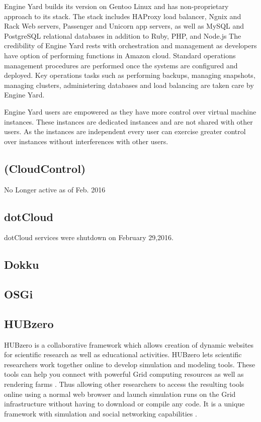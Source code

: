     Engine Yard builds its version on Gentoo Linux and has
    non-proprietary approach to its stack. The stack includes HAProxy
    load balancer, Ngnix and Rack Web servers, Passenger and Unicorn
    app servers, as well as MySQL and PostgreSQL relational databases
    in addition to Ruby, PHP, and Node.js The credibility of Engine
    Yard rests with orchestration and management as developers have
    option of performing functions in Amazon cloud. Standard
    operations management procedures are performed once the systems
    are configured and deployed. Key operations tasks such as
    performing backups, managing snapshots, managing clusters,
    administering databases and load balancing are taken care by
    Engine Yard.
    
    Engine Yard users are empowered as they have more control over
    virtual machine instances. These instances are dedicated instances
    and are not shared with other users. As the instances are
    independent every user can exercise greater control over instances
    without interferences with other users.

\subsection{(CloudControl)}

    No Longer active as of Feb. 2016 \cite{www-wiki}

\subsection{dotCloud \cite{www-dotCloud}}

    dotCloud services were shutdown on February 29,2016.
    

\subsection{Dokku}
\subsection{OSGi}
\subsection{HUBzero}
     
     HUBzero is a collaborative framework which allows creation of
     dynamic websites for scientific research as well as educational
     activities.  HUBzero lets scientific researchers work together
     online to develop simulation and modeling tools.  These tools can
     help you connect with powerful Grid computing resources as well
     as rendering farms \cite{hubzerowebsite}. Thus allowing other
     researchers to access the resulting tools online using a normal
     web browser and launch simulation runs on the Grid infrastructure
     without having to download or compile any code. It is a unique
     framework with simulation and social networking
     capabilities \cite{hubzeropaper2010}.

